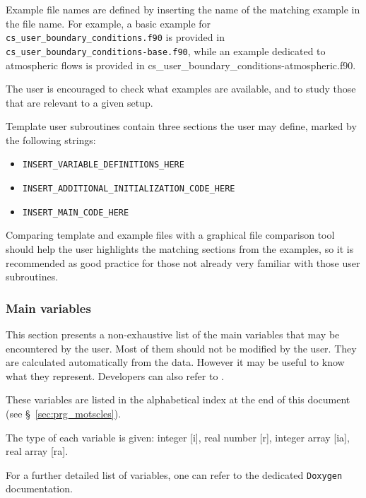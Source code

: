 {{{{Example file names are defined by inserting the name of the matching example
in the file name. For example, a basic example for
\texttt{cs\_user\_boundary\_conditions.f90} is provided in \\
\texttt{cs\_user\_boundary\_conditions-base.f90}, while an example dedicated
to atmospheric flows is provided in
{cs\_user\_boundary\_conditions-atmospheric.f90}.

The user is encouraged to check what examples are available, and to study
those that are relevant to a given setup.

Template user subroutines contain three sections the user may define,
marked by the following strings:

\begin{itemize}
\item \texttt{INSERT\_VARIABLE\_DEFINITIONS\_HERE}
\item \texttt{INSERT\_ADDITIONAL\_INITIALIZATION\_CODE\_HERE}
\item \texttt{INSERT\_MAIN\_CODE\_HERE}
\end{itemize}

Comparing template and example files with a graphical file comparison tool
should help the user highlights the matching sections from the examples,
so it is recommended as good practice for those not already very familiar
with those user subroutines.

\subsubsection{Main variables}

This section presents a non-exhaustive list of the main variables that
may be encountered by the user. Most of them should not be modified by the
user. They are calculated automatically from the data. However it may be
useful to know what they represent.
Developers can also refer to \cite{theory}.

These variables are listed in the alphabetical index at the end of this
document (see \S~\ref{sec:prg_motscles}).

The type of each variable is given: integer [i], real number [r],
integer array [ia], real array [ra].

For a further detailed list of variables, one can refer to the dedicated
\texttt{Doxygen} documentation.

\label{sec:prg_dimensions}

}}}}
